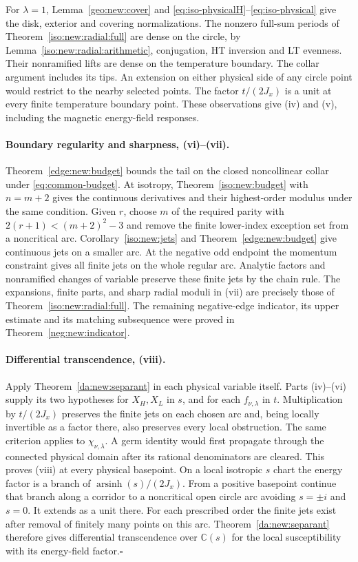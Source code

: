 \documentclass[11pt]{article}
\numberwithin{equation}{section}
\theoremstyle{definition}
\newcommand{\C}{\mathbb C}
\begin{document}
For $\lambda=1$, Lemma~\ref{geo:new:cover} and
\eqref{eq:iso-physicalH}--\eqref{eq:iso-physical} give the disk,
exterior and covering normalizations. The nonzero full-sum periods
of Theorem~\ref{iso:new:radial:full} are dense on the circle, by
Lemma~\ref{iso:new:radial:arithmetic}, conjugation, HT inversion
and LT evenness. Their nonramified lifts are dense on the temperature
boundary. The collar argument includes its tips. An extension on
either physical side of any circle point would restrict to the
nearby selected points. The factor $t/(2J_x)$ is a unit at every
finite temperature boundary point. These observations give (iv)
and (v), including the magnetic energy-field responses.

\paragraph{Boundary regularity and sharpness, (vi)--(vii).}
Theorem~\ref{edge:new:budget} bounds the tail on the closed
noncollinear collar under \eqref{eq:common-budget}. At isotropy,
Theorem~\ref{iso:new:budget} with $n=m+2$ gives the continuous
derivatives and their highest-order modulus under the same condition.
Given $r$, choose $m$ of the required parity with $2(r+1)<(m+2)^2-3$ and
remove the finite lower-index exception set from a noncritical arc.
Corollary~\ref{iso:new:jets} and Theorem~\ref{edge:new:budget}
give continuous jets on a smaller arc. At the negative odd endpoint
the momentum constraint gives all finite jets on the whole regular
arc. Analytic factors and nonramified changes of variable preserve
these finite jets by the chain rule. The expansions, finite parts,
and sharp radial moduli in (vii) are precisely those of
Theorem~\ref{iso:new:radial:full}. The remaining negative-edge
indicator, its upper estimate and its matching subsequence were
proved in Theorem~\ref{neg:new:indicator}.

\paragraph{Differential transcendence, (viii).}
Apply Theorem~\ref{da:new:separant} in each physical
variable itself. Parts (iv)--(vi) supply its two hypotheses for
$X_H,X_L$ in $s$, and for each $f_{\nu,\lambda}$ in $t$.
Multiplication by $t/(2J_x)$ preserves the finite jets on each
chosen arc and, being locally invertible as a factor there,
also preserves every local obstruction. The same criterion applies
to $\chi_{\nu,\lambda}$. A germ identity would first propagate
through the connected physical domain after its rational denominators
are cleared. This proves (viii) at every physical basepoint. On a
local isotropic $s$ chart the energy factor is a branch of
$\operatorname{arsinh}(s)/(2J_x)$. From a positive basepoint
continue that branch along a corridor to a noncritical open circle
arc avoiding $s=\pm i$ and $s=0$. It extends as a unit there.
For each prescribed order the finite jets exist after removal of
finitely many points on this arc. Theorem~\ref{da:new:separant}
therefore gives differential transcendence over $\C(s)$ for the
local susceptibility with its energy-field factor.\hfill\(\square\)
\end{document}
